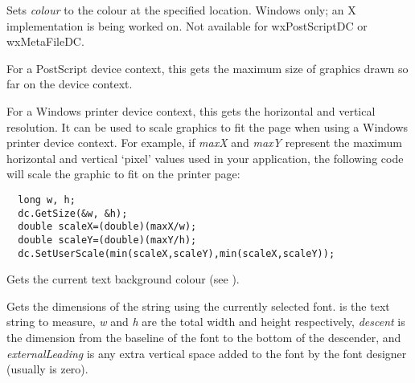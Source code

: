 \label{wxdcgetpixel}


Sets {\it colour} to the colour at the specified location. Windows only; an X implementation
is being worked on. Not available for wxPostScriptDC or wxMetaFileDC.

\label{wxdcgetsize}


For a PostScript device context, this gets the maximum size of graphics
drawn so far on the device context.

For a Windows printer device context, this gets the horizontal and vertical
resolution. It can be used to scale graphics to fit the page when using
a Windows printer device context. For example, if {\it maxX} and {\it maxY}\rtfsp
represent the maximum horizontal and vertical `pixel' values used in your
application, the following code will scale the graphic to fit on the
printer page:

\begin{verbatim}
  long w, h;
  dc.GetSize(&w, &h);
  double scaleX=(double)(maxX/w);
  double scaleY=(double)(maxY/h);
  dc.SetUserScale(min(scaleX,scaleY),min(scaleX,scaleY));
\end{verbatim}

\label{wxdcgettextbackground}


Gets the current text background colour (see ).

\label{wxdcgettextextent}


Gets the dimensions of the string using the currently selected font.
 is the text string to measure, {\it w} and {\it h} are
the total width and height respectively, {\it descent} is the
dimension from the baseline of the font to the bottom of the
descender, and {\it externalLeading} is any extra vertical space added
to the font by the font designer (usually is zero).

